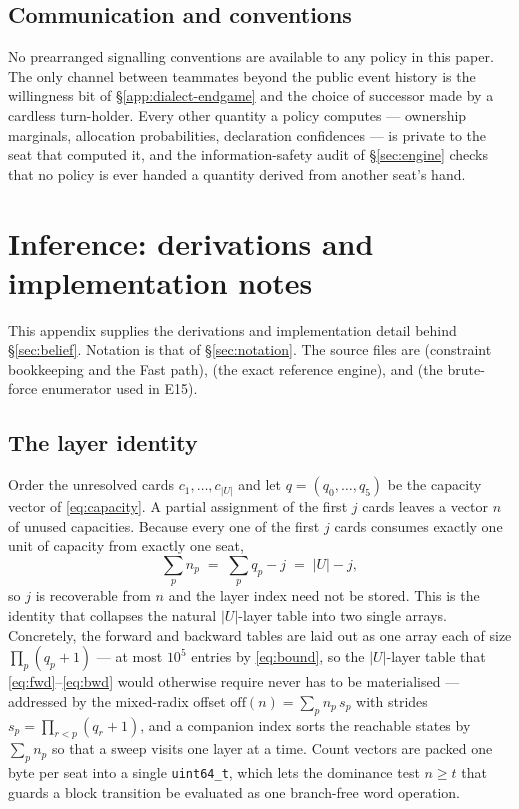 \documentclass[11pt]{article}
\theoremstyle{definition}
\begin{document}
\subsection{Communication and conventions}
\label{app:dialect-conventions}

No prearranged signalling conventions are available to any policy in this paper.
The only channel between teammates beyond the public event history is the
willingness bit of \S\ref{app:dialect-endgame} and the choice of successor made
by a cardless turn-holder. Every other quantity a policy computes --- ownership
marginals, allocation probabilities, declaration confidences --- is private to
the seat that computed it, and the information-safety audit of
\S\ref{sec:engine} checks that no policy is ever handed a quantity derived from
another seat's hand.
\section{Inference: derivations and implementation notes}
\label{app:inference}

This appendix supplies the derivations and implementation detail behind
\S\ref{sec:belief}. Notation is that of \S\ref{sec:notation}. The source files
are  (constraint bookkeeping and the Fast path),
 (the exact reference engine), and
 (the brute-force enumerator used in E15).

\subsection{The layer identity}
\label{app:layer}

Order the unresolved cards $c_1,\dots,c_{|U|}$ and let $q = (q_0,\dots,q_5)$ be
the capacity vector of \eqref{eq:capacity}. A partial assignment of the first $j$
cards leaves a vector $n$ of unused capacities. Because every one of the first
$j$ cards consumes exactly one unit of capacity from exactly one seat,
\[
  \sum_p n_p \;=\; \sum_p q_p - j \;=\; |U| - j ,
\]
so $j$ is recoverable from $n$ and the layer index need not be stored. This is
the identity that collapses the natural $|U|$-layer table into two single arrays.
Concretely, the forward and backward tables are laid out as one array each of
size $\prod_p (q_p+1)$ --- at most $10^5$ entries by \eqref{eq:bound}, so the
$|U|$-layer table that \eqref{eq:fwd}--\eqref{eq:bwd} would otherwise require
never has to be materialised --- addressed by the mixed-radix offset
$\mathrm{off}(n) = \sum_p n_p \, s_p$ with strides $s_p = \prod_{r<p}(q_r+1)$,
and a companion index sorts the reachable states by $\sum_p n_p$ so that a sweep
visits one layer at a time. Count vectors are packed one byte per seat into a
single \verb|uint64_t|, which lets the dominance test $n \ge t$ that guards a
block transition be evaluated as one branch-free word operation.
\end{document}
